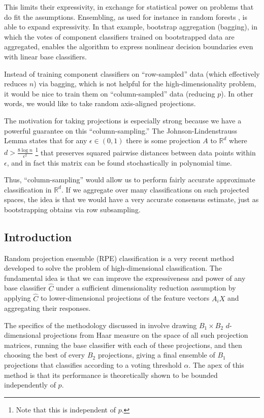 \documentclass{amsart}
\begin{document}
This limits their expressivity, in exchange for statistical power on problems that do fit the assumptions. Ensembling, as used for instance in random forests \cite{Breiman01}, is able to expand expressivity. In that example, bootstrap aggregation (bagging), in which the votes of component classifiers trained on bootstrapped data are aggregated, enables the algorithm to express nonlinear decision boundaries even with linear base classifiers.

Instead of training component classifiers on ``row-sampled'' data (which effectively reduces $n$) via bagging, which is not helpful for the high-dimensionality problem, it would be nice to train them on ``column-sampled'' data (reducing $p$). In other words, we would like to take random axis-aligned projections.

The motivation for taking projections is especially strong because we have a powerful guarantee on this ``column-sampling.'' The Johnson-Lindenstrauss Lemma \cite{DG03} states that for any $\epsilon\in(0,1)$ there is some projection $A$ to $\mathbb R^d$ where $d>\frac{8\log n}{\epsilon^2}$ \footnote{Note that this is independent of $p$.} that preserves squared pairwise distances between data points within $\epsilon$, and in fact this matrix can be found stochastically in polynomial time.

Thus, ``column-sampling'' would allow us to perform fairly accurate approximate classification in $\mathbb R^d$. If we aggregate over many classifications on such projected spaces, the idea is that we would have a very accurate consensus estimate, just as bootstrapping obtains via row subsampling.


\subsection{Introduction}

Random projection ensemble (RPE) classification is a very recent method developed to solve the problem of high-dimensional classification.
The fundamental idea is that we can improve the expressiveness and power of any base classifier $\hat C$ under a sufficient dimensionality reduction assumption by applying $\hat C$ to lower-dimensional projections of the feature vectors $A_i X$ and aggregating their responses.

The specifics of the methodology discussed in \cite{CS15} involve drawing $B_{1}\times B_{2}$ $d$-dimensional projections from Haar measure on the space of all such projection matrices, running the base classifier with each of these projections, and then choosing the best of every $B_{2}$ projections, giving a final ensemble of $B_{1}$ projections that classifies according to a voting threshold $\alpha$. The apex of this method is that its performance is theoretically shown to be bounded independently of $p$.
\end{document}

